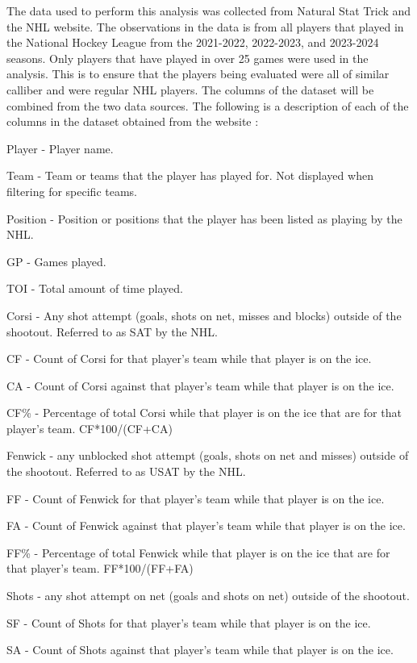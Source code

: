 \documentclass[12pt]{article}
\begin{document}
The data used to perform this analysis was collected from Natural Stat Trick and the NHL website. The observations in the data
is from all players that played in the National Hockey League from the 2021-2022, 2022-2023, and 2023-2024 seasons. Only players
that have played in over 25 games were used in the analysis. This is to ensure that the players being evaluated were all of similar 
calliber and were regular NHL players. The columns of the dataset will be combined from the two data sources. The following is a 
description of each of the columns in the dataset obtained from the website \cite{natural_stat_trick}:

Player - Player name.

Team - Team or teams that the player has played for. Not displayed when filtering for specific teams.

Position - Position or positions that the player has been listed as playing by the NHL.

GP - Games played.

TOI - Total amount of time played.

Corsi - Any shot attempt (goals, shots on net, misses and blocks) outside of the shootout. Referred to as SAT by the NHL.

CF - Count of Corsi for that player's team while that player is on the ice.

CA - Count of Corsi against that player's team while that player is on the ice.

CF\% - Percentage of total Corsi while that player is on the ice that are for that player's team. CF*100/(CF+CA)

Fenwick - any unblocked shot attempt (goals, shots on net and misses) outside of the shootout. Referred to as USAT by the NHL.

FF - Count of Fenwick for that player's team while that player is on the ice.

FA - Count of Fenwick against that player's team while that player is on the ice.

FF\% - Percentage of total Fenwick while that player is on the ice that are for that player's team. FF*100/(FF+FA)

Shots - any shot attempt on net (goals and shots on net) outside of the shootout.

SF - Count of Shots for that player's team while that player is on the ice.

SA - Count of Shots against that player's team while that player is on the ice.
\end{document}
